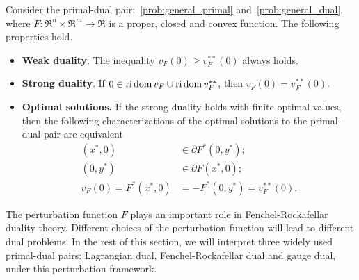 \begin{theorem} Consider the primal-dual pair:~\eqref{prob:general_primal} and~\eqref{prob:general_dual}, where $F: \Re^n \times \Re^m \to \Re$ is a proper, closed and convex function. The following properties hold. 
    \begin{itemize}
        \item \textbf{Weak duality}. The inequality $v_F(0) \geq v_F^{**}(0)$ always holds. 
        \item \textbf{Strong duality}. If $0 \in \operatorname{ri}\operatorname{dom} v_F \cup \operatorname{ri}\operatorname{dom} v_F^{**}$, then $v_F(0) = v_F^{**}(0)$. 
        \item \textbf{Optimal solutions.} If the strong duality holds with finite optimal values, then the following characterizations of the optimal solutions to the primal-dual pair are equivalent
        \begin{equation} \label{eq:dual_opt}
            \begin{split}
                (x^*, 0) &\in \partial F^*(0,y^*); \\
                (0, y^*) &\in \partial F(x^*,0); \\
                v_F(0) = F^*(x^*, 0) &= -F^*(0,y^*) = v_F^{**}(0).
            \end{split}
        \end{equation}
    \end{itemize}
\end{theorem}

The perturbation function $F$ plays an important role in Fenchel-Rockafellar duality theory. Different choices of the perturbation function will lead to different dual problems. In the rest of this section, we will interpret three widely used primal-dual pairs: Lagrangian dual, Fenchel-Rockafellar dual and gauge dual, under this perturbation framework.  


